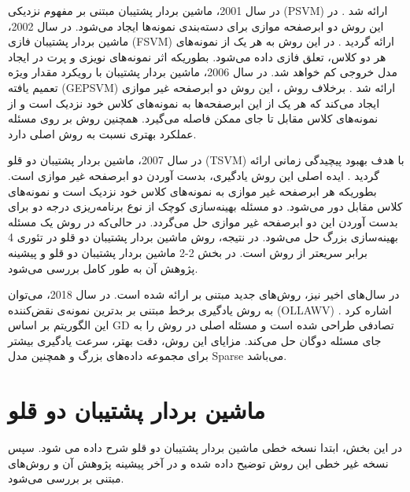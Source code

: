 در سال 2001، ماشین بردار پشتیبان مبتنی بر مفهوم نزدیکی (\gls{PSVM}) ارائه شد \cite{mang2001}. در این روش دو ابرصفحه موازی برای دسته‌بندی نمونه‌ها ایجاد می‌شود. در سال 2002، ماشین بردار پشتیبان فازی (\gls{FSVM}) ارائه گردید \cite{lin2002}. در این روش به هر یک از نمونه‌های هر دو کلاس، تعلق فازی داده می‌شود. بطوریکه اثر نمونه‌های نویزی و پرت در ایجاد مدل خروجی کم خواهد شد. در سال 2006، ماشین بردار پشتیبان با رویکرد مقدار ویژه تعمیم یافته  (\gls{GEPSVM}) ارائه شد \cite{mang2006}. برخلاف روش ، این روش دو ابرصفحه غیر موازی ایجاد می‌کند که هر یک از این ابرصفحه‌ها به نمونه‌های کلاس خود نزدیک است و از نمونه‌های کلاس مقابل تا جای ممکن فاصله می‌گیرد. همچنین روش  بر روی مسئله  عملکرد بهتری نسبت به روش  اصلی دارد.

در سال 2007، ماشین بردار پشتیبان دو قلو (\gls*{TSVM}) با هدف بهبود پیچیدگی زمانی  ارائه گردید \cite{jayadeva2007}. ایده اصلی این روش یادگیری، بدست آوردن دو ابرصفحه غیر موازی است. بطوریکه هر ابرصفحه غیر موازی به نمونه‌های کلاس خود نزدیک است و نمونه‌های کلاس مقابل دور می‌شود. دو مسئله بهینه‌سازی کوچک از نوع برنامه‌ریزی درجه دو برای بدست آوردن این دو ابرصفحه غیر موازی حل می‌گردد. در حالی‌که در روش  یک مسئله بهینه‌سازی بزرگ حل می‌شود. در نتیجه، روش ماشین بردار پشتیبان دو قلو در تئوری 4 برابر سریعتر از روش  است. در بخش ‏2-2 ماشین بردار پشتیبان دو قلو و پیشینه پژوهش آن به طور کامل بررسی می‌شود.

در سال‌های اخیر نیز، روش‌های جدید مبتنی بر  ارائه شده است. در سال 2018، می‌توان به روش یادگیری برخط مبتنی بر بدترین نمونه‌ی نقض‌کننده (\gls{OLLAWV}) اشاره کرد \cite{melki2018}. این الگوریتم بر اساس \gls{GD} تصادفی طراحی شده است و مسئله اصلی در روش  را به جای مسئله دوگان حل می‌کند. مزایای این روش، دقت بهتر، سرعت یادگیری بیشتر برای مجموعه داده‌های بزرگ و همچنین مدل \gls{Sparse} می‌باشد.

\section{ماشین بردار پشتیبان دو قلو}\label{sec:2:2}
در این بخش، ابتدا نسخه خطی ماشین بردار پشتیبان دو قلو شرح داده می شود. سپس نسخه غیر خطی این روش توضیح داده شده و در آخر پیشینه پژوهش آن و روش‌های مبتنی بر  بررسی می‌شود.

